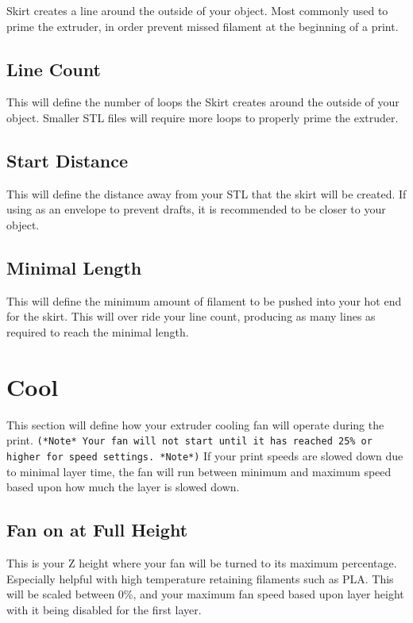 Skirt creates a line around the outside of your object. Most commonly used to prime the extruder, in order prevent missed filament at the beginning of a print.

\subsection{Line Count}

This will define the number of loops the Skirt creates around the outside of your object. Smaller STL files will require more loops to properly prime the extruder.

\subsection{Start Distance}

This will define the distance away from your STL that the skirt will be created. If using as an envelope to prevent drafts, it is recommended to be closer to your object.

\subsection{Minimal Length}

This will define the minimum amount of filament to be pushed into your hot end for the skirt. This will over ride your line count, producing as many lines as required to reach the minimal length.

\section{Cool}

This section will define how your extruder cooling fan will operate during the print. \texttt{(*Note* Your fan will not start until it has reached 25\% or higher for speed settings. *Note*)} If your print speeds are slowed down due to minimal layer time, the fan will run between minimum and maximum speed based upon how much the layer is slowed down.

\subsection{Fan on at Full Height}

This is your Z height where your fan will be turned to its maximum percentage. Especially helpful with high temperature retaining filaments such as PLA. This will be scaled between 0\%, and your maximum fan speed based upon layer height with it being disabled for the first layer.

